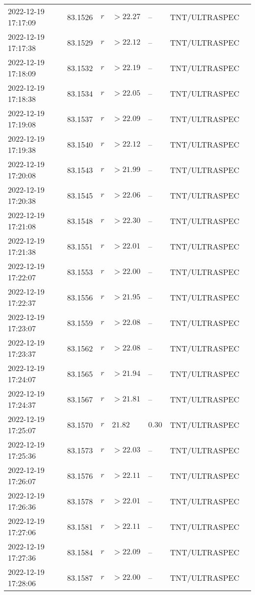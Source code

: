 \documentclass{nature_plusfigure}
\begin{document}
\begin{supplement}
\begin{center}
\begin{longtable}{lllllll}
2022-12-19 17:17:09 & 83.1526 & $r$ & $>22.27$ & -- & TNT/ULTRASPEC &  \\ 
2022-12-19 17:17:38 & 83.1529 & $r$ & $>22.12$ & -- & TNT/ULTRASPEC &  \\ 
2022-12-19 17:18:09 & 83.1532 & $r$ & $>22.19$ & -- & TNT/ULTRASPEC &  \\ 
2022-12-19 17:18:38 & 83.1534 & $r$ & $>22.05$ & -- & TNT/ULTRASPEC &  \\ 
2022-12-19 17:19:08 & 83.1537 & $r$ & $>22.09$ & -- & TNT/ULTRASPEC &  \\ 
2022-12-19 17:19:38 & 83.1540 & $r$ & $>22.12$ & -- & TNT/ULTRASPEC &  \\ 
2022-12-19 17:20:08 & 83.1543 & $r$ & $>21.99$ & -- & TNT/ULTRASPEC &  \\ 
2022-12-19 17:20:38 & 83.1545 & $r$ & $>22.06$ & -- & TNT/ULTRASPEC &  \\ 
2022-12-19 17:21:08 & 83.1548 & $r$ & $>22.30$ & -- & TNT/ULTRASPEC &  \\ 
2022-12-19 17:21:38 & 83.1551 & $r$ & $>22.01$ & -- & TNT/ULTRASPEC &  \\ 
2022-12-19 17:22:07 & 83.1553 & $r$ & $>22.00$ & -- & TNT/ULTRASPEC &  \\ 
2022-12-19 17:22:37 & 83.1556 & $r$ & $>21.95$ & -- & TNT/ULTRASPEC &  \\ 
2022-12-19 17:23:07 & 83.1559 & $r$ & $>22.08$ & -- & TNT/ULTRASPEC &  \\ 
2022-12-19 17:23:37 & 83.1562 & $r$ & $>22.08$ & -- & TNT/ULTRASPEC &  \\ 
2022-12-19 17:24:07 & 83.1565 & $r$ & $>21.94$ & -- & TNT/ULTRASPEC &  \\ 
2022-12-19 17:24:37 & 83.1567 & $r$ & $>21.81$ & -- & TNT/ULTRASPEC &  \\ 
2022-12-19 17:25:07 & 83.1570 & $r$ & $21.82$ & $0.30$ & TNT/ULTRASPEC &  \\ 
2022-12-19 17:25:36 & 83.1573 & $r$ & $>22.03$ & -- & TNT/ULTRASPEC &  \\ 
2022-12-19 17:26:07 & 83.1576 & $r$ & $>22.11$ & -- & TNT/ULTRASPEC &  \\ 
2022-12-19 17:26:36 & 83.1578 & $r$ & $>22.01$ & -- & TNT/ULTRASPEC &  \\ 
2022-12-19 17:27:06 & 83.1581 & $r$ & $>22.11$ & -- & TNT/ULTRASPEC &  \\ 
2022-12-19 17:27:36 & 83.1584 & $r$ & $>22.09$ & -- & TNT/ULTRASPEC &  \\ 
2022-12-19 17:28:06 & 83.1587 & $r$ & $>22.00$ & -- & TNT/ULTRASPEC &  \\ 

\end{longtable}
\end{center}
\end{supplement}
\end{document}
